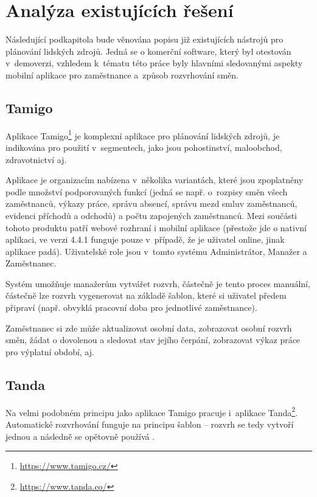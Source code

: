 \documentclass[twoside]{ctuthesis}
\begin{document}
\section{Analýza existujících řešení}
\label{sec:existing}
Následující podkapitola bude věnována popisu již existujících nástrojů pro plánování lidských zdrojů. Jedná se o komerční software, který byl otestován v~demoverzi, vzhledem k~tématu této práce byly hlavními sledovanými aspekty mobilní aplikace pro zaměstnance a~způsob rozvrhování směn.

\subsection{Tamigo}
Aplikace Tamigo\footnote{\url{https://www.tamigo.cz/}} je komplexní aplikace pro plánování lidských zdrojů, je indikována pro použití v~segmentech, jako jsou pohostinství, maloobchod, zdravotnictví aj. \cite{tamigo2020reseni}

Aplikace je organizacím nabízena v~několika variantách, které jsou zpop\-lat\-ně\-ny podle množství podporovaných funkcí (jedná se např. o~rozpisy směn všech zaměstnanců, výkazy práce, správu absencí, správu mezd smluv zaměstnanců, evidenci příchodů a odchodů) a počtu zapojených zaměstnanců. Mezi součásti tohoto produktu patří webové rozhraní i mobilní aplikace (přestože jde o nativní aplikaci, ve verzi 4.4.1 funguje pouze v~případě, že je uživatel online, jinak aplikace padá). Uživatelské role jsou v~tomto systému Administrátor, Manažer a Zaměstnanec.

Systém umožňuje manažerům vytvářet rozvrh, částečně je tento proces manuální, částečně lze rozvrh vygenerovat na základě šablon, které si uživatel předem připraví (např. obvyklá pracovní doba pro jednotlivé zaměstnance). %

Za\-měst\-na\-nec si zde může aktualizovat osobní data, zobrazovat osobní rozvrh směn, žádat o dovolenou a sledovat stav jejího čerpání, zobrazovat výkaz práce pro výplatní období, aj.

\subsection{Tanda}
Na velmi podobném principu jako aplikace Tamigo pracuje i~aplikace Tanda\footnote{\url{https://www.tanda.co/}}. Automatické rozvrhování funguje na principu šablon -- rozvrh se tedy vytvoří jednou a následně se opětovně používá \cite{tanda2020rosters}.
\end{document}
